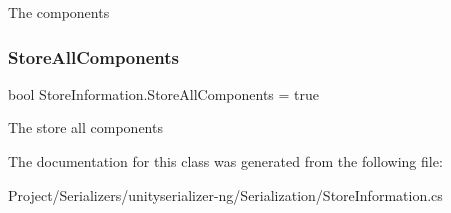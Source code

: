 The components 

\mbox{\label{class_store_information_aa4732e6bb5c4dcff1a7d7482c785b1f5}} 
\subsubsection{\texorpdfstring{Store\+All\+Components}{StoreAllComponents}}
{\footnotesize\ttfamily bool Store\+Information.\+Store\+All\+Components = true}



The store all components 



The documentation for this class was generated from the following file\+:\begin{DoxyCompactItemize}
\item 
Project/\+Serializers/unityserializer-\/ng/\+Serialization/Store\+Information.\+cs\end{DoxyCompactItemize}
